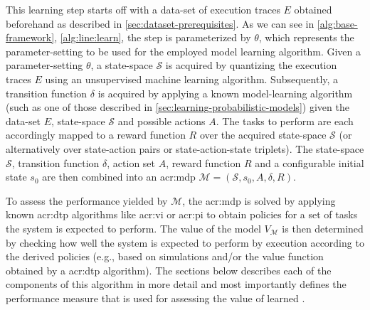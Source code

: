 This learning step starts off with a data-set of execution traces $E$ obtained beforehand as described in \autoref{sec:dataset-prerequisites}.
As we can see in \autoref{alg:base-framework}, \autoref{alg:line:learn}, the step is parameterized by $\theta$, which represents the parameter-setting to be used for the employed model learning algorithm.
Given a parameter-setting $\theta$, a state-space $\mathcal{S}$ is acquired by quantizing the execution traces $E$ using an unsupervised machine learning algorithm.
Subsequently, a transition function $\delta$ is acquired by applying a known model-learning algorithm (such as one of those described in \autoref{sec:learning-probabilistic-models}) given the data-set $E$, state-space $\mathcal{S}$ and possible actions $A$.
The tasks to perform are each accordingly mapped to a reward function $R$ over the acquired state-space $\mathcal{S}$ (or alternatively over state-action pairs or state-action-state triplets).
The state-space $\mathcal{S}$, transition function $\delta$, action set $A$, reward function $R$ and a configurable initial state $s_0$ are then combined into an \acrshort{acr:mdp} $\mathcal{M} = (\mathcal{S}, s_0, A, \delta, R)$.

To assess the performance yielded by $\mathcal{M}$, the \acrshort{acr:mdp} is solved by applying known \acrshort{acr:dtp} algorithms like \acrshort{acr:vi} or \acrshort{acr:pi} to obtain policies for a set of tasks the system is expected to perform.
The value of the model $V_{\mathcal{M}}$ is then determined by checking how well the system is expected to perform by execution according to the derived policies (e.g., based on simulations and/or the value function obtained by a \acrshort{acr:dtp} algorithm).
The sections below describes each of the components of this algorithm in more detail and most importantly defines the performance measure that is used for assessing the value of learned .


